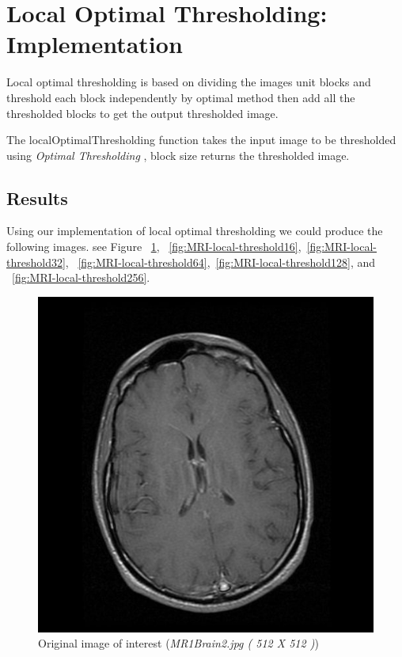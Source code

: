 \documentclass[letterpaper, 12 pt, conference ,onecolumn]{ieeeconf}  %
\begin{document}
\section*{Local Optimal Thresholding: Implementation}
Local optimal thresholding is based on dividing the images unit blocks and threshold each block
independently by optimal method then add all the thresholded blocks to get the output thresholded image.
 
The localOptimalThresholding function takes the input image to be thresholded using \textit{Optimal Thresholding} , block size returns the thresholded image.

\subsection*{\textbf{Results}}
Using our implementation of local optimal thresholding we could produce the following images. see Figure ~\ref{fig:MRI-original-image}, ~\ref{fig:MRI-local-threshold16},~\ref{fig:MRI-local-threshold32},  ~\ref{fig:MRI-local-threshold64},~\ref{fig:MRI-local-threshold128}, and ~\ref{fig:MRI-local-threshold256}. 

\begin{figure}[h!]
\centering
\includegraphics[width=0.4\paperwidth]{optimal-thresholding/global/MRI-original-image.jpg}
\caption{Original image of interest (\textit{MR1Brain2.jpg ( 512 X 512 )}) }
\label{fig:MRI-original-image}
\end{figure}
\end{document}
